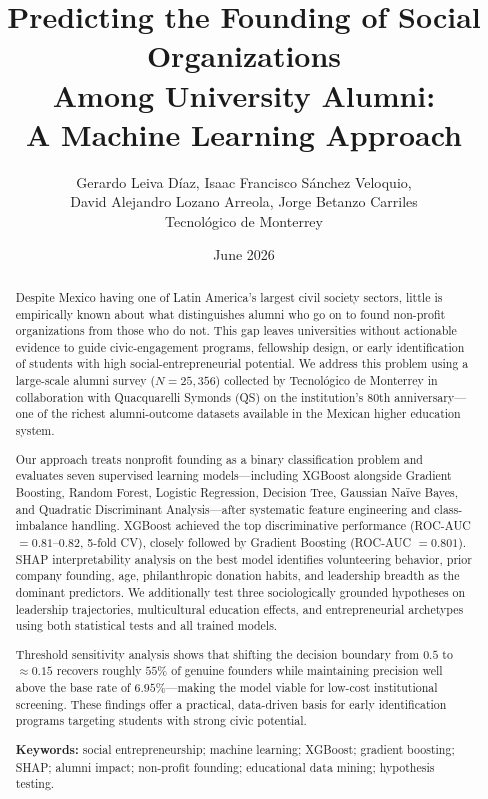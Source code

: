\documentclass[10pt,twocolumn]{article}
\title{\textbf{Predicting the Founding of Social Organizations\\
Among University Alumni:\\
A Machine Learning Approach}}
\author{Gerardo Leiva Díaz, Isaac Francisco Sánchez Veloquio,\\
        David Alejandro Lozano Arreola, Jorge Betanzo Carriles\\
        \small Tecnológico de Monterrey}
\date{June 2026}
\begin{document}
\maketitle

\begin{abstract}
\noindent
Despite Mexico having one of Latin America's largest civil society sectors, little is empirically known about what distinguishes alumni who go on to found non-profit organizations from those who do not. This gap leaves universities without actionable evidence to guide civic-engagement programs, fellowship design, or early identification of students with high social-entrepreneurial potential. We address this problem using a large-scale alumni survey ($N = 25{,}356$) collected by Tecnológico de Monterrey in collaboration with Quacquarelli Symonds (QS) on the institution's 80th anniversary—one of the richest alumni-outcome datasets available in the Mexican higher education system.

Our approach treats nonprofit founding as a binary classification problem and evaluates seven supervised learning models—including XGBoost alongside Gradient Boosting, Random Forest, Logistic Regression, Decision Tree, Gaussian Naïve Bayes, and Quadratic Discriminant Analysis—after systematic feature engineering and class-imbalance handling. XGBoost achieved the top discriminative performance (ROC-AUC $= 0.81$--$0.82$, 5-fold CV), closely followed by Gradient Boosting (ROC-AUC $= 0.801$). SHAP interpretability analysis on the best model identifies volunteering behavior, prior company founding, age, philanthropic donation habits, and leadership breadth as the dominant predictors. We additionally test three sociologically grounded hypotheses on leadership trajectories, multicultural education effects, and entrepreneurial archetypes using both statistical tests and all trained models.

Threshold sensitivity analysis shows that shifting the decision boundary from $0.5$ to $\approx 0.15$ recovers roughly $55\%$ of genuine founders while maintaining precision well above the base rate of $6.95\%$—making the model viable for low-cost institutional screening. These findings offer a practical, data-driven basis for early identification programs targeting students with strong civic potential.

\medskip
\noindent\textbf{Keywords:} social entrepreneurship; machine learning; XGBoost; gradient boosting; SHAP; alumni impact; non-profit founding; educational data mining; hypothesis testing.
\end{abstract}
\end{document}
